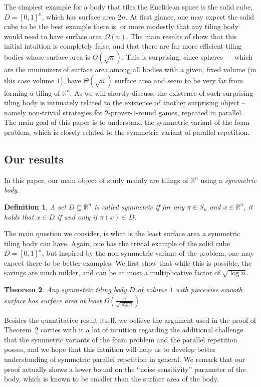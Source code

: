 \documentclass[10pt,a4paper]{article}
\newtheorem{thm}{Theorem}
\newtheorem{definition}[thm]{Definition}
\begin{document}
The simplest example for a body that tiles the Euclidean space is the solid cube, $D = [0,1]^n$, which has surface
area $2n$. At first glance, one may expect the solid cube to be the best example there is, or more modestly
that any tiling body would need to have surface area $\Omega(n)$. The main results of \cite{KROW,AK}
show that this initial intuition is completely false, and that there are far more efficient tiling bodies whose surface area is $O(\sqrt{n})$.
This is surprising, since spheres --- which are the minimizers of surface area among all bodies with a given, fixed volume
(in this case volume $1$), have $\Theta(\sqrt{n})$ surface area and seem to be very far from forming a tiling of $\mathbb{R}^n$.
As we will shortly discuss, the existence of such surprising tiling body is intimately related to the existence of another
surprising object -- namely non-trivial strategies for $2$-prover-$1$-round games, repeated in parallel. The main goal of this
paper is to understand the symmetric variant of the foam problem, which is closely related to the symmetric variant of
parallel repetition.


\setcounter{thm}{3}\setcounter{subsection}{2}\subsection{Our results}
In this paper, our main object of study mainly are tilings of $\mathbb{R}^n$ using a \emph{symmetric body}.
\begin{definition}
  A set $D\subseteq\mathbb{R}^n$ is called symmetric if
  for any $\pi\in S_n$ and $x\in\mathbb{R}^n$, it holds that
  $x\in D$ if and only if $\pi(x)\in D$.
\end{definition}

The main question we consider, is what is the least surface area a symmetric tiling body can have.
Again, one has the trivial example of the solid cube $D = [0,1]^n$, but inspired by the non-symmetric
variant of the problem, one may expect there to be better examples. We first show that while this is
possible, the savings are much milder, and can be at most a multiplicative factor of $\sqrt{\log n}$.

\begin{thm}\label{thm:lb}
	Any symmetric tiling body $D$ of volume $1$
	with piecewise smooth surface has surface area at least $\Omega\left(\frac{n}{\sqrt{\log n}}\right)$.
\end{thm}


Besides the quantitative result itself, we believe the argument used in the proof of Theorem~\ref{thm:lb}
carries with it a lot of intuition regarding the additional challenge that the symmetric variants of the foam problem
and the parallel repetition posses, and we hope that this intuition will help us to develop better understanding
of symmetric parallel repetition in general. We remark that our proof actually shows a lower bound on the ``noise sensitivity''
parameter of the body, which is known to be smaller than the surface area of the body.
\end{document}
